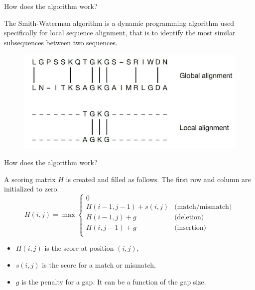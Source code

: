     



    \begin{frame}{How does the algorithm work?}

        The Smith-Waterman algorithm is a dynamic programming algorithm used specifically for local sequence alignment, that is to identify the most similar subsequences between two sequences.

        \vspace{20pt}

        \begin{figure}
            \centering
            \includegraphics[width=0.5\linewidth]{global_vs_local_alignment.jpg}
        \end{figure}

    \end{frame}



    \begin{frame}{How does the algorithm work?}

        A scoring matrix $H$ is created and filled as follows. The first row and column are initialized to zero.
        \[
            H(i, j) = \max \begin{cases} 
            0 \\
            H(i-1, j-1) + s(i, j) & \text{(match/mismatch)} \\
            H(i-1, j) + g & \text{(deletion)} \\
            H(i, j-1) + g & \text{(insertion)} \\
            \end{cases}
        \]

        \begin{itemize}
            \item $H(i, j)$ is the score at position $(i, j)$,
            \item $s(i, j)$ is the score for a match or mismatch,
            \item $g$ is the penalty for a gap. It can be a function of the gap size. 
        \end{itemize}
        
    \end{frame}

